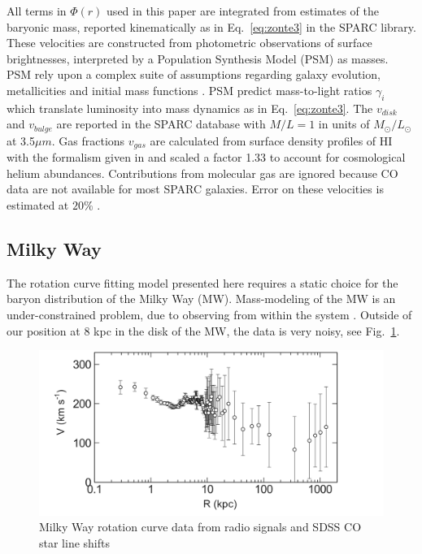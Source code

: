 \documentclass[reprint,%
 amsmath,amssymb,
 aps,
]{revtex4-1}
\begin{document}
   
     All terms in $\Phi(r)$ used in this paper  are    integrated from estimates of the baryonic mass, reported kinematically as in Eq.~\ref{eq:zonte3} in the      SPARC  library.   These velocities  are constructed from photometric observations of surface brightnesses, interpreted   by a Population Synthesis Model (PSM)\cite{10.1093/mnras/sty3223} as     masses. 
PSM rely upon a complex  suite of  assumptions regarding galaxy evolution, metallicities and initial mass functions  \cite{BelldYong,10.1093/mnras/sty3223}. PSM predict   mass-to-light ratios  $\gamma_i$
 which translate  luminosity into mass dynamics as in Eq.~\ref{eq:zonte3}. 
     The $v_{disk}$ and $v_{bulge}$ are reported in the SPARC database with $ M/L = 1$ in units of  $M_{\odot} / L_{\odot}$   at 3.5$\mu m$.
     Gas fractions $v_{gas}$ are calculated from surface density profiles of HI  with the formalism given in  \cite{1983MNRAS.203..735C} and scaled 
     a factor 1.33 to account for cosmological helium abundances.  
     Contributions from molecular gas are ignored   because CO data are not available for most SPARC galaxies. 
     Error on these velocities is estimated at $20\%$ \cite{2016Lelli}. 
     
      
  
 

  
 


\subsection{Milky Way}
The rotation curve fitting model presented here requires a static choice for the baryon distribution of the   Milky Way (MW).   Mass-modeling of the MW is an under-constrained problem, due to     observing from       within  the system  \cite{1991ARA&A..29..409F}.
 Outside of our position at 8 kpc in the disk of the MW, the data is very 
 noisy, see  Fig.~\ref{fig:mwSofue}.
 
 \begin{figure}
    \centering
    \includegraphics[width=\linewidth]{Sofue_MWtoLGData}
    \caption{Milky Way rotation curve data from radio signals and SDSS CO star line shifts  \cite{Sof11}}
    \label{fig:mwSofue}
\end{figure}
\end{document}

